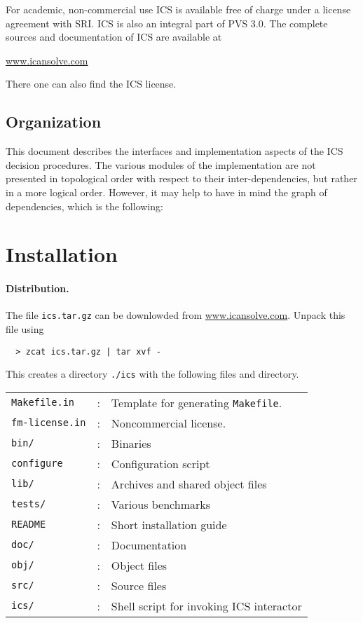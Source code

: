 \documentclass[12pt]{article}
\begin{document}
For academic, non-commercial use ICS is available free of charge under a 
license agreement with SRI.  ICS is also an integral part of PVS 3.0\@.
The complete sources and documentation of ICS are available at
  \begin{center}
  \url{www.icansolve.com}
  \end{center}
There one can also find the ICS license.


\subsection{Organization}

This document describes the interfaces and implementation
aspects of the ICS decision procedures.  The various modules of 
the implementation are not presented in
topological order with respect to their inter-dependencies, but
rather in a more logical order. However, it may help to have in mind
the graph of dependencies, which is the following:


\epsfxsize=15cm
\begin{center}
\end{center}


\section{Installation}\label{sec:installation}

\paragraph{Distribution.}
The file \texttt{ics.tar.gz} can be downlowded from \url{www.icansolve.com}.
Unpack this file using
  \begin{verbatim}
  > zcat ics.tar.gz | tar xvf -
  \end{verbatim}
This creates a directory \texttt{./ics} with the following files
and directory.\\
  \begin{tabular}{lcl}
   \texttt{Makefile.in}  & : & Template for generating \texttt{Makefile}.  \\
   \texttt{fm-license.in} & : & Noncommercial license. \\
   \texttt{bin/} & : & Binaries \\
   \texttt{configure} & : & Configuration script \\
   \texttt{lib/} & : & Archives and shared object files  \\
   \texttt{tests/} & : & Various benchmarks  \\
   \texttt{README} & : & Short installation guide  \\
   \texttt{doc/} & : & Documentation \\
   \texttt{obj/} & : & Object files \\
   \texttt{src/} & : & Source files \\
   \texttt{ics/} & : & Shell script for invoking ICS interactor\\
  \end{tabular}
\end{document}
